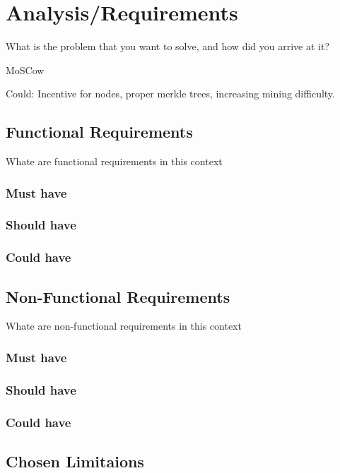 \documentclass{l4proj}
\begin{document}
\chapter{Analysis/Requirements}
What is the problem that you want to solve, and how did you arrive at it?

MoSCow

Could: Incentive for nodes, proper merkle trees, increasing mining difficulty.

\section{Functional Requirements}
Whate are functional requirements in this context

\subsection{Must have}
\subsection{Should have}
\subsection{Could have}

\section{Non-Functional Requirements}
Whate are non-functional requirements in this context

\subsection{Must have}
\subsection{Should have}
\subsection{Could have}

\section{Chosen Limitaions}
\end{document}
